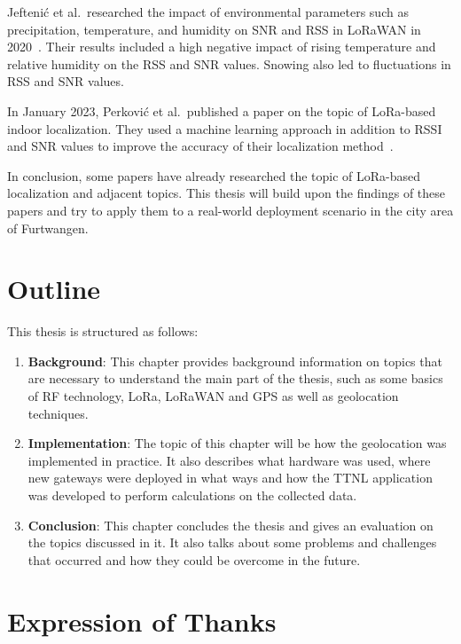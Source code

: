 Jeftenić et al.\ researched the impact of environmental parameters such as precipitation, temperature, and humidity on \ac{SNR} and \ac{RSS} in \ac{LoRaWAN} in 2020~\cite{jeftenic_impact_2020}.
Their results included a high negative impact of rising temperature and relative humidity on the \ac{RSS} and \ac{SNR} values.
Snowing also led to fluctuations in \ac{RSS} and \ac{SNR} values.

In January 2023, Perković et al.\ published a paper on the topic of \ac{LoRa}-based indoor localization.
They used a machine learning approach in addition to \ac{RSSI} and \ac{SNR} values to improve the accuracy of their localization method~\cite{perkovic_machine_2023}.

In conclusion, some papers have already researched the topic of \ac{LoRa}-based localization and adjacent topics.
This thesis will build upon the findings of these papers and try to apply them to a real-world deployment scenario in the city area of Furtwangen.

\section{Outline}

This thesis is structured as follows:

\begin{enumerate}
      \item \textbf{Background}:
            This chapter provides background information on topics that are necessary to understand the main part of the thesis, such as some basics of \ac{RF} technology, \ac{LoRa}, \ac{LoRaWAN} and \ac{GPS} as well as geolocation techniques.
      \item \textbf{Implementation}:
            The topic of this chapter will be how the geolocation was implemented in practice.
            It also describes what hardware was used, where new gateways were deployed in what ways and how the \ac{TTNL} application was developed to perform calculations on the collected data.
      \item \textbf{Conclusion}:
            This chapter concludes the thesis and gives an evaluation on the topics discussed in it.
            It also talks about some problems and challenges that occurred and how they could be overcome in the future.
\end{enumerate}


\section{Expression of Thanks}\label{sec:expression-of-thanks}

